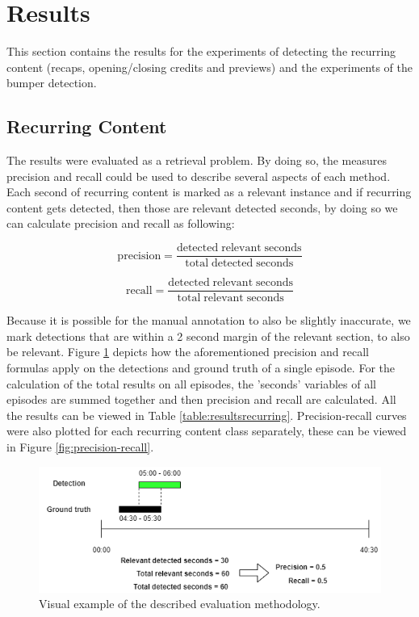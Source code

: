 \documentclass{article}
\begin{document}
\section{Results} \label{results}
This section contains the results for the experiments of detecting the recurring content (recaps, opening/closing credits and previews) and the experiments of the bumper detection.

\subsection{Recurring Content}
The results were evaluated as a retrieval problem. By doing so, the measures precision and recall could be used to describe several aspects of each method. Each second of recurring content is marked as a relevant instance and if recurring content gets detected, then those are relevant detected seconds, by doing so we can calculate precision and recall as following:

\[\mathrm{precision} = \frac{\mathrm{detected\;relevant\;seconds}}{\mathrm{total\;detected\;seconds}}\]

\[\mathrm{recall} = \frac{\mathrm{detected\;relevant\;seconds}}{\mathrm{total\;relevant\;seconds}}\]

Because it is possible for the manual annotation to also be slightly inaccurate, we mark detections that are within a 2 second margin of the relevant section, to also be relevant. Figure \ref{fig:evaluation-example} depicts how the aforementioned precision and recall formulas apply on the detections and ground truth of a single episode. For the calculation of the total results on all episodes, the 'seconds' variables of all episodes are summed together and then precision and recall are calculated. All the results can be viewed in Table \ref{table:resultsrecurring}. Precision-recall curves were also plotted for each recurring content class separately, these can be viewed in Figure \ref{fig:precision-recall}.

\begin{figure}[H]
	\includegraphics[width=\textwidth]{images/evaluation.png}
	\centering
	\caption{Visual example of the described evaluation methodology.}
	\label{fig:evaluation-example}
\end{figure}
\end{document}
